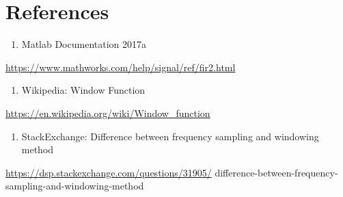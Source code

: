\documentclass[titlepage]{article}
\begin{document}
\section{References}
\label{sec:orged80038}
\begin{enumerate}
\item Matlab Documentation 2017a
\end{enumerate}
\url{https://www.mathworks.com/help/signal/ref/fir2.html}

\begin{enumerate}
\item Wikipedia: Window Function
\end{enumerate}
\url{https://en.wikipedia.org/wiki/Window\_function}

\begin{enumerate}
\item StackExchange: Difference between frequency sampling and windowing method
\end{enumerate}
\url{https://dsp.stackexchange.com/questions/31905/}
difference-between-frequency-sampling-and-windowing-method
\end{document}
